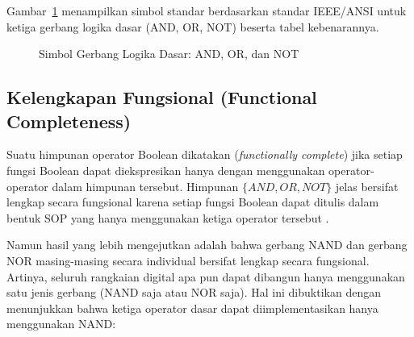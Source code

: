 Gambar~\ref{fig:gerbang-dasar} menampilkan simbol standar berdasarkan standar IEEE/ANSI untuk ketiga gerbang logika dasar (AND, OR, NOT) beserta tabel kebenarannya.

\begin{figure}[htbp]
\centering
{}
\caption{Simbol Gerbang Logika Dasar: AND, OR, dan NOT}
\label{fig:gerbang-dasar}
\end{figure}

\subsection{Kelengkapan Fungsional (Functional Completeness)}

Suatu himpunan operator Boolean dikatakan  (\textit{functionally complete}) jika setiap fungsi Boolean dapat diekspresikan hanya dengan menggunakan operator-operator dalam himpunan tersebut. Himpunan $\{AND, OR, NOT\}$ jelas bersifat lengkap secara fungsional karena setiap fungsi Boolean dapat ditulis dalam bentuk SOP yang hanya menggunakan ketiga operator tersebut \cite{rosen2019}.

Namun hasil yang lebih mengejutkan adalah bahwa gerbang NAND dan gerbang NOR masing-masing secara individual bersifat lengkap secara fungsional. Artinya, seluruh rangkaian digital apa pun dapat dibangun hanya menggunakan satu jenis gerbang (NAND saja atau NOR saja). Hal ini dibuktikan dengan menunjukkan bahwa ketiga operator dasar dapat diimplementasikan hanya menggunakan NAND:

